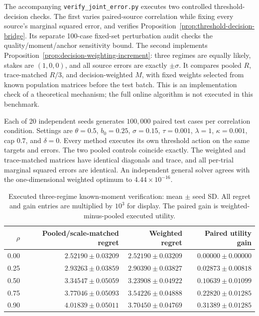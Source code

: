 \documentclass[10pt]{article}
\begin{document}
The accompanying \texttt{verify\_joint\_error.py} executes two controlled
threshold-decision checks. The first varies paired-source correlation while
fixing every source's marginal squared error, and verifies
Proposition~\ref{prop:threshold-decision-bridge}. Its separate 100-case
fixed-set perturbation audit checks the quality/moment/anchor sensitivity bound.
The second implements Proposition~\ref{prop:decision-weighting-increment}:
three regimes are equally likely, stakes are $(1,0,0)$, and all source errors
are exactly $\pm\sigma$. It compares pooled $R$, trace-matched $R/3$, and
decision-weighted $M$, with fixed weights selected from known population
matrices before the test batch. This is an implementation check of a theoretical
mechanism; the full online algorithm is not executed in this benchmark.

Each of 20 independent seeds generates $100{,}000$ paired test cases per
correlation condition. Settings are $\theta=0.5$, $b_0=0.25$, $\sigma=0.15$,
$\tau=0.001$, $\lambda=1$, $\kappa=0.001$, cap $0.7$, and $\delta=0$.
Every method executes its own threshold action on the same targets and errors.
The two pooled controls coincide exactly. The weighted and trace-matched
matrices have identical diagonals and trace, and all per-trial marginal squared
errors are identical. An independent general solver agrees with the
one-dimensional weighted optimum to $4.44\times10^{-16}$.

\begin{table}[htbp]
\centering\small
\caption{Executed three-regime known-moment verification: mean $\pm$ seed SD.
All regret and gain entries are multiplied by $10^3$ for display. The paired
gain is weighted-minus-pooled executed utility.}
\label{tab:decision-weighting-check}
\begin{tabular}{rrrr}
\toprule
$\rho$ & Pooled/scale-matched regret & Weighted regret & Paired utility gain\\
\midrule
0.00 & $2.52190\pm0.03209$ & $2.52190\pm0.03209$ & $0.00000\pm0.00000$\\
0.25 & $2.93263\pm0.03859$ & $2.90390\pm0.03827$ & $0.02873\pm0.00818$\\
0.50 & $3.34547\pm0.05059$ & $3.23908\pm0.04922$ & $0.10639\pm0.01099$\\
0.75 & $3.77046\pm0.05093$ & $3.54226\pm0.04888$ & $0.22820\pm0.01285$\\
0.90 & $4.01839\pm0.05011$ & $3.70450\pm0.04769$ & $0.31389\pm0.01285$\\
\bottomrule
\end{tabular}
\end{table}
\end{document}
